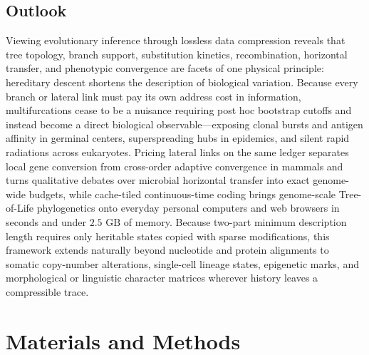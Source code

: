 \documentclass[11pt,a4paper]{article}
\begin{document}
\subsection*{Outlook}

Viewing evolutionary inference through lossless data compression reveals that tree topology, branch support, substitution kinetics, recombination, horizontal transfer, and phenotypic convergence are facets of one physical principle: hereditary descent shortens the description of biological variation. Because every branch or lateral link must pay its own address cost in information, multifurcations cease to be a nuisance requiring post hoc bootstrap cutoffs and instead become a direct biological observable---exposing clonal bursts and antigen affinity in germinal centers, superspreading hubs in epidemics, and silent rapid radiations across eukaryotes. Pricing lateral links on the same ledger separates local gene conversion from cross-order adaptive convergence in mammals and turns qualitative debates over microbial horizontal transfer into exact genome-wide budgets, while cache-tiled continuous-time coding brings genome-scale Tree-of-Life phylogenetics onto everyday personal computers and web browsers in seconds and under $2.5\text{ GB}$ of memory. Because two-part minimum description length requires only heritable states copied with sparse modifications, this framework extends naturally beyond nucleotide and protein alignments to somatic copy-number alterations, single-cell lineage states, epigenetic marks, and morphological or linguistic character matrices wherever history leaves a compressible trace.

\section*{Materials and Methods}
\end{document}
